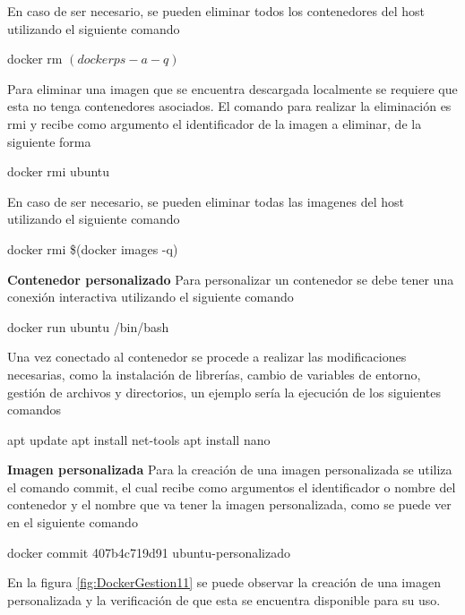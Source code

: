En caso de ser necesario, se pueden eliminar todos los contenedores del host utilizando el siguiente comando 
\begin{commandshell} docker rm $(docker ps -a -q)$ \end{commandshell}

Para eliminar una imagen que se encuentra descargada localmente se requiere que esta no tenga contenedores asociados. El comando para realizar la eliminación es rmi y recibe como argumento el identificador de la imagen a eliminar, de la siguiente forma

\begin{commandshell} docker rmi ubuntu \end{commandshell}

En caso de ser necesario, se pueden eliminar todas las imagenes del host utilizando el siguiente comando 
\begin{commandshell}docker rmi \$(docker images -q)\end{commandshell}

\textbf{Contenedor personalizado}
Para personalizar un contenedor se debe tener una conexión interactiva utilizando el siguiente comando
\begin{commandshell}docker run ubuntu /bin/bash \end{commandshell}

Una vez conectado al contenedor se procede a realizar las modificaciones necesarias, como la instalación de librerías, cambio de variables de entorno, gestión de archivos y directorios, un ejemplo sería la ejecución de los siguientes comandos
\begin{commandshellroot}
apt update
apt install net-tools
apt install nano
\end{commandshellroot}

\textbf{Imagen personalizada}
Para la creación de una imagen personalizada se utiliza el comando commit, el cual recibe como argumentos el identificador o nombre del contenedor y el nombre que va tener la imagen personalizada, como se puede ver en el siguiente comando

\begin{commandshell}docker commit 407b4c719d91 ubuntu-personalizado \end{commandshell}

En la figura \ref{fig:DockerGestion11} se puede observar la creación de una imagen personalizada y la verificación de que esta se encuentra disponible para su uso.

